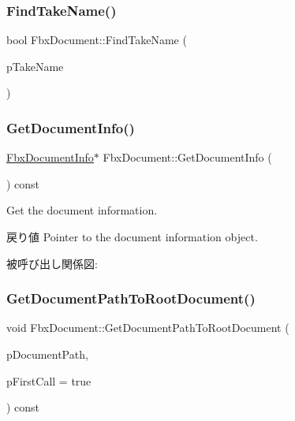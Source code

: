 \subsubsection{\texorpdfstring{Find\+Take\+Name()}{FindTakeName()}}
{\footnotesize\ttfamily bool Fbx\+Document\+::\+Find\+Take\+Name (\begin{DoxyParamCaption}\item[{const \hyperlink{class_fbx_string}{Fbx\+String} \&}]{p\+Take\+Name }\end{DoxyParamCaption})\hspace{0.3cm}{\ttfamily [protected]}}

\mbox{\label{class_fbx_document_a396a7cf0d0c422a872a6df2cec608b11}} 
\subsubsection{\texorpdfstring{Get\+Document\+Info()}{GetDocumentInfo()}}
{\footnotesize\ttfamily \hyperlink{class_fbx_document_info}{Fbx\+Document\+Info}$\ast$ Fbx\+Document\+::\+Get\+Document\+Info (\begin{DoxyParamCaption}{ }\end{DoxyParamCaption}) const}

Get the document information. \begin{DoxyReturn}{戻り値}
Pointer to the document information object. 
\end{DoxyReturn}
被呼び出し関係図\+:
\mbox{\label{class_fbx_document_acdf3bb31bc3a0e3d2c9a8b73fb2fff30}} 
\subsubsection{\texorpdfstring{Get\+Document\+Path\+To\+Root\+Document()}{GetDocumentPathToRootDocument()}}
{\footnotesize\ttfamily void Fbx\+Document\+::\+Get\+Document\+Path\+To\+Root\+Document (\begin{DoxyParamCaption}\item[{\hyperlink{class_fbx_array}{Fbx\+Array}$<$ \hyperlink{class_fbx_document}{Fbx\+Document} $\ast$$>$ \&}]{p\+Document\+Path,  }\item[{bool}]{p\+First\+Call = {\ttfamily true} }\end{DoxyParamCaption}) const}

